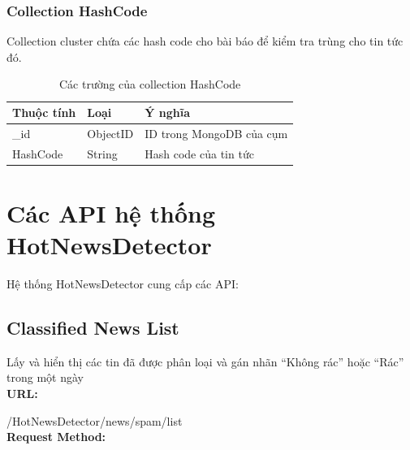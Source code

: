 		\subsubsection{Collection HashCode}
		Collection cluster chứa các hash code cho bài báo để kiểm tra trùng cho tin tức đó.
		\begin{table}[H]
			\setlength\extrarowheight{3pt}
			\begin{tabular}{|l|l|p{9cm}|}
				\hline
				\textbf{Thuộc tính}     & \textbf{Loại} & \textbf{Ý nghĩa} \\\hline
				\_id           & ObjectID       &  ID trong MongoDB của cụm\\\hline
				HashCode      & String           & Hash code của tin tức\\\hline
			\end{tabular}%
			\caption{Các trường của collection HashCode}
			\label{tab:table_3_3}%
		\end{table}%
\section{Các API hệ thống HotNewsDetector}
Hệ thống HotNewsDetector cung cấp các API:
\subsection{Classified News List}
Lấy và hiển thị các tin đã được phân loại và gán nhãn “Không rác” hoặc “Rác” trong một ngày \\
\textbf{URL:}

/HotNewsDetector/news/spam/list\\
\textbf{Request Method:}

